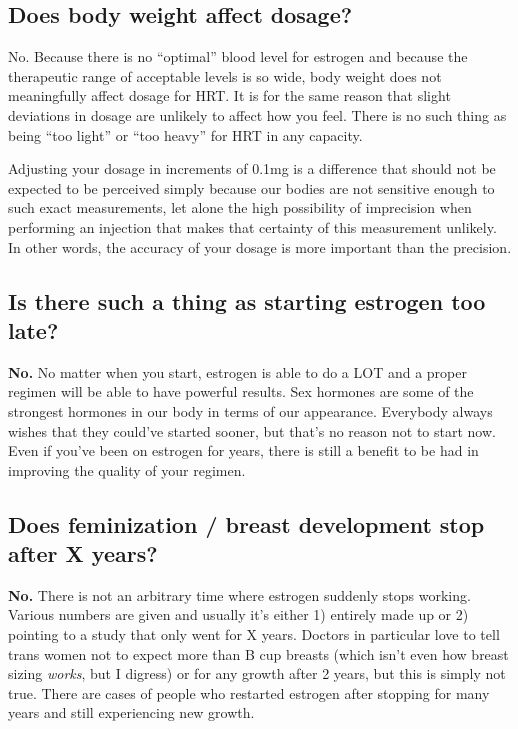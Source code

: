\documentclass{article}
\begin{document}
\subsection{Does body weight affect dosage?}

No. Because there is no “optimal” blood level for estrogen and because the therapeutic range of acceptable levels is so wide, body weight does not meaningfully affect dosage for HRT. It is for the same reason that slight deviations in dosage are unlikely to affect how you feel. There is no such thing as being “too light” or “too heavy” for HRT in any capacity.

Adjusting your dosage in increments of 0.1mg is a difference that should not be expected to be perceived simply because our bodies are not sensitive enough to such exact measurements, let alone the high possibility of imprecision when performing an injection that makes that certainty of this measurement unlikely. In other words, the accuracy of your dosage is more important than the precision.

\subsection{Is there such a thing as starting estrogen too late?}

\textbf{No.} No matter when you start, estrogen is able to do a LOT and a proper regimen will be able to have powerful results. Sex hormones are some of the strongest hormones in our body in terms of our appearance. Everybody always wishes that they could’ve started sooner, but that’s no reason not to start now. Even if you’ve been on estrogen for years, there is still a benefit to be had in improving the quality of your regimen.

\subsection{Does feminization / breast development stop after X years?}

\textbf{No.} There is not an arbitrary time where estrogen suddenly stops working. Various numbers are given and usually it’s either 1) entirely made up or 2) pointing to a study that only went for X years. Doctors in particular love to tell trans women not to expect more than B cup breasts (which isn’t even how breast sizing \textit{works}, but I digress) or for any growth after 2 years, but this is simply not true. There are cases of people who restarted estrogen after stopping for many years and still experiencing new growth.
\end{document}
